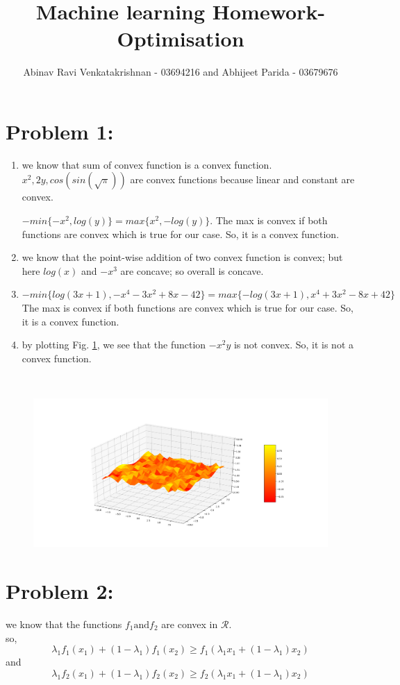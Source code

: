 \documentclass[5pt,a4paper]{article}
\begin{document}
	\title{Machine learning Homework- Optimisation}
	\author{Abinav Ravi Venkatakrishnan - 03694216 and Abhijeet Parida - 03679676}
	\maketitle
	\section*{Problem 1:}
	\begin{enumerate}
		\item we know that sum of convex function is a convex function. $x^2, 2y,cos(sin(\sqrt{\pi}))$ are convex functions because linear and constant are convex.
		
		$-min\{-x^2,log(y)\}=max\{x^2,-log(y)\}$. The max is convex if both functions are convex which is true for our case. So, it is a convex function.
		
		\item we know that the point-wise addition of two convex function is convex; but here $log(x)$ and $-x^3$ are concave; so overall is concave.
		\item $-min\{log(3x + 1), -x^4 -3x^2 + 8x-42\} =  max\{-log(3x + 1), x^4 +3x^	2 - 8x + 42\}$ The max is convex if both functions are convex which is true for our case. So, it is a convex function.
		
		\item by plotting Fig. \ref{plot}, we see that the function $-x^2y $ is not convex. So, it is not a convex function. 
	\end{enumerate}\
	\begin{figure}[h!]
		\centering
		\includegraphics[width=1\textwidth]{x2y.png}
		\caption{}
		\label{plot}
	\end{figure}
	
	\section*{Problem 2:}
	we know that the functions $f_1 \text{and} f_2$ are convex in $\mathcal{R}$.\\
	so,
	\begin{equation}
	\lambda_1 f_1(x_1)+(1-\lambda_1)f_1(x_2) \geqslant f_1(\lambda_1 x_1+(1-\lambda_1)x_2)
	\label{one}
	\end{equation}
	and \\
	\begin{equation}
	\lambda_1 f_2(x_1)+(1-\lambda_1)f_2(x_2) \geqslant f_2(\lambda_1 x_1+(1-\lambda_1)x_2)
	\label{two}
	\end{equation}
\end{document}
